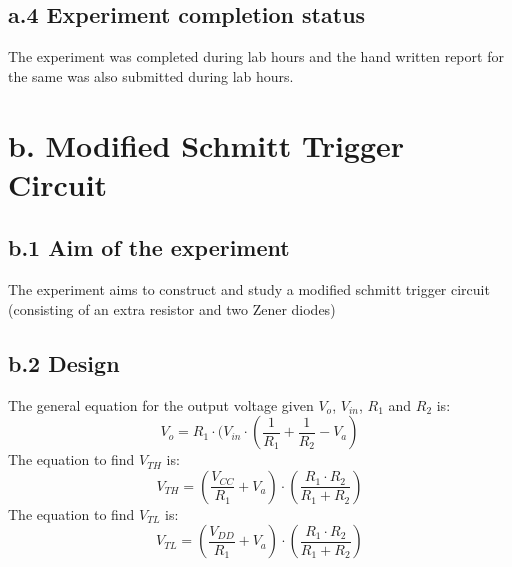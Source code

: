 \documentclass[12pt]{article}
\begin{document}
\subsection*{a.4 Experiment completion status}
The experiment was completed during lab hours and the hand written report
for the same was also submitted during lab hours.


\section*{b. Modified Schmitt Trigger Circuit}
\subsection*{b.1 Aim of the experiment}
The experiment aims to construct and study a modified schmitt trigger circuit (consisting of an extra resistor and two Zener diodes)\\
\subsection*{b.2 Design}
The general equation for the output voltage given $V_{o}$, $V_{in}$, $R_{1}$ and $R_{2}$ is:
 \begin{equation}
     V_{o} = R_{1} \cdot (V_{in}\cdot(\frac{1}{R_{1}} + \frac{1}{R_{2}} - V_{a})
 \end{equation}  
The equation to find $V_{TH}$ is:
 \begin{equation}
     V_{TH} = (\frac{V_{CC}}{R_{1}} + V_{a}) \cdot (\frac{R_{1}\cdot R_{2}}{R_{1} + R_{2}})
 \end{equation}   
 The equation to find $V_{TL}$ is:
 \begin{equation}
     V_{TL} = (\frac{V_{DD}}{R_{1}} + V_{a}) \cdot (\frac{R_{1}\cdot R_{2}}{R_{1} + R_{2}})
 \end{equation}   
 


\end{document}
